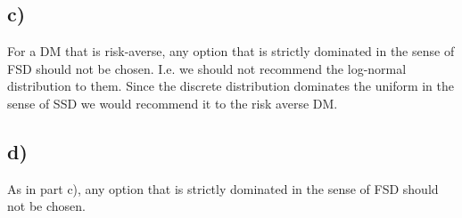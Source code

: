 \documentclass{article}
\begin{document}
\subsection{c)}
	For a DM that is risk-averse, any option that is strictly dominated in the sense of FSD should not be chosen. I.e. we should not recommend the log-normal distribution to them. 
	Since the discrete distribution dominates the uniform in the sense of SSD we would recommend it to the risk averse DM.
\subsection{d)}
	As in part c), any option that is strictly dominated in the sense of FSD should not be chosen.
	
\end{document}
